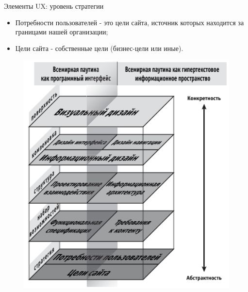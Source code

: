 \documentclass{beamer}
\begin{document}
\begin{frame}{Элементы UX: уровень стратегии}
\begin{itemize}
\item Потребности пользователей - это цели сайта, источник которых находится за границами нашей организации;
\item Цели сайта - собственные цели (бизнес-цели или иные).
\end{itemize}
\begin{figure}[h]
\centering
\includegraphics[scale=0.4]{images/lec01-pic12.png}
\end{figure}
\end{frame}
\end{document}
